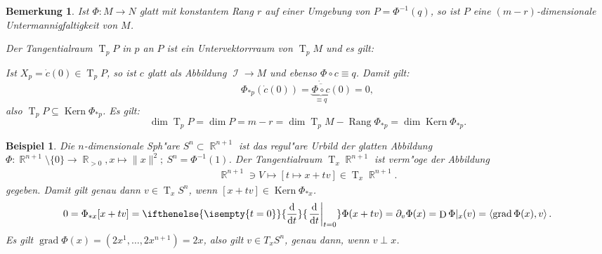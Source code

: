 \documentclass[paper=A4, twoside, chapterprefix=true, bibliography=totoc, headsepline]{scrbook}
\newcommand{\tikzschnuller}[2][1]{
	\coordinate (schnuller1) at #2; \coordinate (schnuller2) at ($(schnuller1)+#1*(-1.75,-0.75)$); \coordinate (schnuller3) at ($(schnuller1)+#1*(-2.5,-2.25)$); \coordinate (schnuller4) at ($(schnuller1)+#1*(0,-2)$); \coordinate (schnuller5) at ($(schnuller1)+#1*(1.75,-0.25)$);
    
    \coordinate (ctrls1) at ($#1*(1.25,0.25)$); \coordinate (ctrls2) at ($-0.5*(ctrls1)$); \coordinate (ctrls4) at ($#1*(1,-1)$); \coordinate (ctrls3) at ($-0.5*(ctrls4)$); \coordinate (ctrls6) at ($#1*(1,1.5)$); \coordinate (ctrls5) at ($-0		.33*(ctrls6)$);
    \coordinate (tang1) at ($(schnuller2)+(ctrls1)$); \coordinate (tang2) at ($(schnuller2)+(ctrls2)$); \coordinate (tang3) at ($(schnuller3)+(ctrls3)$); \coordinate (tang4) at ($(schnuller3)+(ctrls4)$); \coordinate (tang5) at ($(schnuller4)+(ctrls5)$); \coordinate (tang6) at ($(schnuller4)+(ctrls6)$);
	
	\draw (schnuller1) ..controls(schnuller1) and (tang1).. (schnuller2) ..controls(tang2) and (tang3).. (schnuller3) ..controls(tang4) and (tang5).. (schnuller4) ..controls(tang6) and (schnuller5).. (schnuller5);
	
	\def\angle{20} %
	\coordinate (c) at ($#2+#1*(-1.25,-1.25)$); %
	\begin{scope}
		\clip[rotate=\angle] ($(c)-#1*(1,0.6)$) rectangle ($(c)+#1*(1,-0.1)$);
		\path[draw,rotate=\angle,name path=l] (c) ellipse(#1*1 and #1*0.5);
	\end{scope}
	\path[name path=u,rotate=\angle] ($(c)-#1*(0,0.5)$) ellipse(#1*0.75 and #1*0.5);
	\path[name intersections={of=u and l}];
	\begin{scope}
		\clip[rotate=\angle] (intersection-1) rectangle ($(intersection-2)+#1*(0,0.5)$);
		\draw[rotate=\angle] ($(c)-#1*(0,0.5)$) ellipse(#1*0.75 and #1*0.5);
	\end{scope}		
}
\newcommand{\tikzsegel}[2][1]{
	\coordinate (segel1) at #2; \coordinate (segel2) at ($(segel1)+#1*(4,1.5)$); \coordinate (segel3) at ($(segel1)+#1*(2,-0.5)$);
	
	\coordinate (ctrls1) at ($#1*(0.75,1.5)$); \coordinate (ctrls2) at ($#1*(-0.75,0.25)$); \coordinate (ctrls3) at ($#1*(-0.5,-0.25)$); \coordinate (ctrls4) at ($#1*(0.25,1)$); \coordinate (ctrls5) at ($#1*(-0.375,0.375)$); \coordinate (ctrls6) at ($#1*(0.75,0.125)$);
	\coordinate (tang1) at ($(segel1)+(ctrls1)$); \coordinate (tang2) at ($(segel2)+(ctrls2)$); \coordinate (tang3) at ($(segel2)+(ctrls3)$); \coordinate (tang4) at ($(segel3)+(ctrls4)$); \coordinate (tang5) at ($(segel3)+(ctrls5)$); \coordinate (tang6) at ($(segel1)+(ctrls6)$);
	
	\draw (segel1) ..controls(tang1) and (tang2).. (segel2) ..controls(tang3) and (tang4).. (segel3) ..controls(tang5) and (tang6).. (segel1) --cycle;
}
\DeclareMathOperator{\R}{\mathbb{R}}
\DeclareMathOperator{\calI}{\mathcal{I}}
\DeclareMathOperator{\grad}{grad} %
\DeclareMathOperator{\D}{D} %
\DeclareMathOperator{\Kern}{Kern}
\DeclareMathOperator{\Rang}{Rang} %
\DeclareMathOperator{\T}{T} %
\newcommand{\dop}{\mathrm{d}}
\newcommand{\difffrac}[3][]{\ifthenelse{\isempty{#1}}{\frac{\dop #2}{\dop #3}}{\left. \frac{\dop #2}{\dop #3} \right|_{#1}}}
\theoremstyle{plain}
\newtheorem{Bsp}[Dfn]{Beispiel}
\theoremstyle{nonumberplain}
\newtheorem{bem}{Bemerkung}
\theoremstyle{empty}
\theoremstyle{break}
\begin{document}
\begin{bem}
  Ist $\Phi \colon M \to N$ glatt mit konstantem Rang $r$ auf einer Umgebung von $P = \Phi^{-1}(q)$, so ist $P$ eine $(m-r)$-dimensionale Untermannigfaltigkeit von $M$.
  
  Der Tangentialraum $\T_pP$ in $p$ an $P$ ist ein Untervektorrraum von $\T_pM$ und es gilt:
  \begin{center}\end{center}

  Ist $X_p = \dot c(0) \in \T_pP$, so ist $c$ glatt als Abbildung $\calI \to M$ und ebenso $\Phi \circ c \equiv q$.
  Damit gilt:
    \[ \Phi_{*p}(\dot c(0)) = \dot{\underbrace{\overline{\Phi \circ c}}_{\equiv q}}(0) = 0, \]
  also $\T_pP \subseteq \Kern \Phi_{*p}$. Es gilt:
   \[ \dim \T_pP = \dim P = m-r = \dim \T_pM - \Rang \Phi_{*p} = \dim \Kern \Phi_{*p}. \]
\end{bem}

\begin{Bsp}
  Die $n$-dimensionale Sph"are $S^n \subset \R^{n+1}$ ist das regul"are Urbild der glatten Abbildung $\Phi \colon \R^{n+1}\setminus \{0\} \to \R_{> 0}, x \mapsto \|x\|^2; \ S^n = \Phi^{-1}(1)$. Der Tangentialraum $\T_x\R^{n+1}$ ist verm"oge der Abbildung
\begin{align*}
  \R^{n+1} \ni V \mapsto [t \mapsto x + tv] \in \T_x\R^{n+1}.
\end{align*}
gegeben. Damit gilt genau dann $v \in \T_xS^n$, wenn $[x+tv] \in \Kern \Phi_{*x}$.
\begin{align*}
  0 = \Phi_{*x}[x+tv] = \difffrac[t=0]{}{t} \Phi(x+tv) = \partial_v \Phi(x) = \D \Phi|_x(v) = \left<\grad\Phi(x),v\right>.
\end{align*}
Es gilt $\grad \Phi(x) = (2x^1, \ldots, 2x^{n+1}) = 2x$, also gilt $v \in T_xS^n$, genau dann, wenn $v \perp x$.
\end{Bsp}
\end{document}

